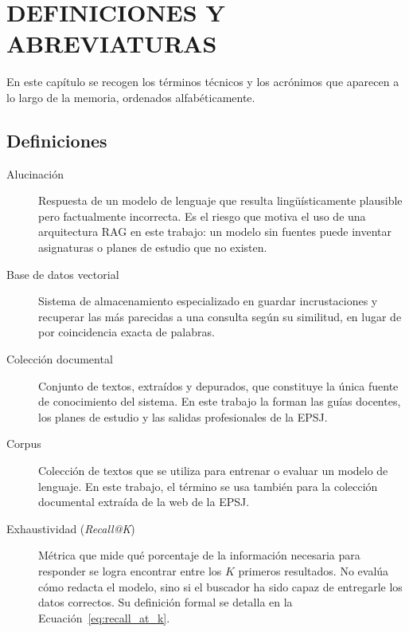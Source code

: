 \chapter{DEFINICIONES Y ABREVIATURAS}
\label{cap:definiciones}

En este capítulo se recogen los términos técnicos y los acrónimos que aparecen
a lo largo de la memoria, ordenados alfabéticamente.

\section{Definiciones}

\begin{description}          
  
  \item[Alucinación] Respuesta de un modelo de lenguaje que resulta
        lingüísticamente plausible pero factualmente incorrecta. Es el riesgo que
        motiva el uso de una arquitectura RAG en este trabajo: un modelo sin
        fuentes puede inventar asignaturas o planes de estudio que no existen.
        
  \item[Base de datos vectorial] Sistema de almacenamiento especializado en
        guardar incrustaciones y recuperar las más parecidas a una consulta según
        su similitud, en lugar de por coincidencia exacta de palabras.
        
  \item[Colección documental] Conjunto de textos, extraídos y depurados, que
        constituye la única fuente de conocimiento del sistema. En este trabajo la
        forman las guías docentes, los planes de estudio y las salidas
        profesionales de la EPSJ.
        
  \item[Corpus] Colección de textos que se utiliza para entrenar o evaluar
        un modelo de lenguaje. En este trabajo, el término se usa también para la
        colección documental extraída de la web de la EPSJ.
        
    \item[Exhaustividad (\textit{Recall@K})] Métrica que mide 
        qué porcentaje de la información necesaria para responder se logra encontrar 
        entre los $K$ primeros resultados. No evalúa cómo redacta el modelo, sino si 
        el buscador ha sido capaz de entregarle los datos correctos. Su definición formal 
        se detalla en la Ecuación~\ref{eq:recall_at_k}.



\end{description}
